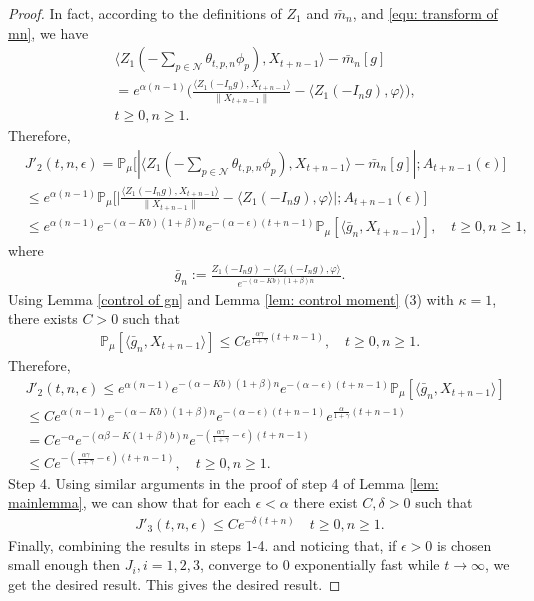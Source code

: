 \documentclass[12pt,a4paper]{amsart}
\theoremstyle{plain}
\theoremstyle{definition}
\numberwithin{equation}{section}
\begin{document}
\begin{proof}
In fact, according to the definitions of $Z_1$ and $\bar{m}_n$, and \eqref{equ: transform of mn}, we have
\begin{align}
    &\langle Z_1(-\sum_{p\in \mathcal{N}}\theta_{t,p,n}\phi_p), X_{t+n-1}\rangle-\bar{m}_n[g]\\
    &=e^{\alpha(n-1)}\Big(\frac{\langle Z_1(-I_ng),X_{t+n-1}\rangle}{\|X_{t+n-1}\|}-\langle Z_1(-I_ng),\varphi\rangle\Big),\\
    & t\geq 0, n\geq1.
\end{align}
Therefore,
\begin{align}
    &J'_2(t,n,\epsilon)
	= \mathbb{P}_{\mu}\big[|\langle Z_1(-\sum_{p\in\mathcal{N}}\theta_{t,p,n}\phi_p),X_{t+n-1}\rangle-\bar{m}_n[g]|; A_{t+n-1}(\epsilon)\big]\\
	&\leq e^{\alpha(n-1)}\mathbb{P}_{\mu}\Big[\big|\frac{\langle Z_1(-I_ng),X_{t+n-1}\rangle}{\|X_{t+n-1}\|}-\langle Z_1(-I_ng),\varphi\rangle\big|;A_{t+n-1}(\epsilon)\Big]\\
	&\leq e^{\alpha(n-1)}e^{-(\alpha-Kb)(1+\beta)n}e^{-(\alpha-\epsilon)(t+n-1)}\mathbb{P}_{\mu}
[\langle \bar {g}_n, X_{t+n-1}\rangle],
	\quad t\geq 0, n\geq 1,
\end{align}
where
\begin{align}
    \bar{g}_n:=\frac{Z_1(-I_ng)-\langle Z_1(-I_ng),\varphi\rangle}{e^{-(\alpha-Kb)(1+\beta)n}}.
\end{align}
Using Lemma \ref{control of gn} and Lemma \ref{lem: control moment} (3) with $\kappa=1$,
 there exists $C>0$ such that
\begin{align}
    \mathbb{P}_{\mu}[\langle \bar{g}_n, X_{t+n-1}\rangle]\leq Ce^{\frac{\alpha \gamma}{1+\gamma}(t+n-1)},\quad t\geq0, n\geq 1.
\end{align}
Therefore,
\begin{align}
    &J'_2(t,n,\epsilon)\leq e^{\alpha(n-1)}e^{-(\alpha-Kb)(1+\beta)n}e^{-(\alpha-\epsilon)(t+n-1)}\mathbb{P}_{\mu}[\langle \bar{g}_n, X_{t+n-1}\rangle]\\
    &\leq C e^{\alpha(n-1)}e^{-(\alpha-Kb)(1+\beta)n}e^{-(\alpha-\epsilon)(t+n-1)}e^{\frac{\alpha }{1+\gamma}(t+n-1)}\\
    &=Ce^{-\alpha}e^{-(\alpha\beta-K(1+\beta)b)n}e^{-(\frac{\alpha\gamma}{1+\gamma}-\epsilon)(t+n-1)}\\&\leq Ce^{-(\frac{\alpha\gamma}{1+\gamma}-\epsilon)(t+n-1)},\quad t\geq 0,n\geq 1.
\end{align}
	Step 4. Using similar arguments in the proof of step 4 of Lemma \ref{lem: mainlemma}, we can show that for each $\epsilon< \alpha$ there exist $C,\delta>0$ such that
\begin{align}\label{ineq: control of J31}
    J'_3(t,n,\epsilon)\leq Ce^{-\delta (t+n)}\quad t\geq0, n\geq 1.
\end{align}
Finally, combining the results in steps 1-4. and noticing that, if $\epsilon>0$ is chosen small enough then $J_{i}, i = 1,2,3$, converge to $0$ exponentially fast while $t\rightarrow\infty$, we get the desired result.
	This gives the desired result.
\end{proof}
\end{document}
